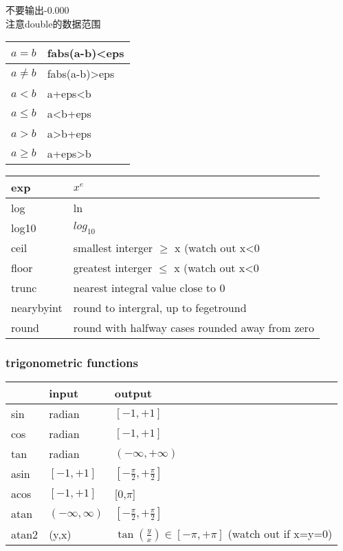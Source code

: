 不要输出-0.000\\

注意double的数据范围\\

\begin{tabular}{|l|l|}
\hline
$a=b$ & fabs(a-b)<eps\\
\hline
$a\neq b$ & fabs(a-b)>eps\\
\hline
$a<b$ &  a+eps<b\\
\hline
$a\leq b$ & a<b+eps\\
\hline
$a>b$  & a>b+eps\\
\hline
$a\geq b$ & a+eps>b\\
\hline
\end{tabular}

\begin{tabular}{|l|l|}
\hline
exp & $x^e$\\
\hline
log & ln\\
\hline
log10 & $log_{10}$\\
\hline
ceil & smallest interger $\geq$ x (watch out x<0\\
\hline
floor & greatest interger $\leq$ x (watch out x<0\\
\hline
trunc & nearest integral value close to 0\\
\hline
nearybyint & round to intergral, up to fegetround\\
\hline
round & round with halfway cases rounded away from zero\\
\hline
\end{tabular}

\subsubsection{trigonometric functions}

\begin{tabular}{|l|l|l|}
\hline
& input & output\\
\hline
sin & radian & $[-1,+1]$\\
\hline
cos & radian & $[-1,+1]$\\
\hline
tan & radian & $(-\infty,+\infty)$\\
\hline
asin & $[-1,+1]$ & $[-\frac{\pi}{2},+\frac{\pi}{2}]$\\
\hline
acos & $[-1,+1]$ & [0,$\pi$]\\
\hline
atan & $(-\infty,\infty)$ & $[-\frac{\pi}{2},+\frac{\pi}{2}]$\\
\hline
atan2 & (y,x) & $\tan(\frac{y}{x}) \in [-\pi,+\pi]$ (watch out if x=y=0)\\
\hline
\end{tabular}

